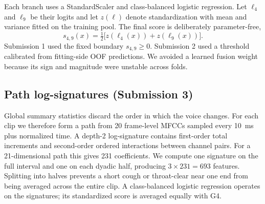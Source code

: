 Each branch uses a StandardScaler and class-balanced logistic regression.
Let $\ell_4$ and $\ell_9$ be their logits and let $z(\ell)$ denote
standardization with mean and variance fitted on the training pool. The final
score is deliberately parameter-free,
\begin{equation}
 s_{4,9}(x)=\tfrac{1}{2}\big[z(\ell_4(x))+z(\ell_9(x))\big].
 \label{eq:fusion}
\end{equation}
Submission 1 used the fixed boundary $s_{4,9}\geq0$. Submission 2 used a
threshold calibrated from fitting-side OOF predictions. We avoided a learned
fusion weight because its sign and magnitude were unstable across folds.

\subsection{Path log-signatures (Submission 3)}

Global summary statistics discard the order in which the voice changes. For
each clip we therefore form a path from 20 frame-level MFCCs sampled every
10~ms plus normalized time. A depth-2 log-signature contains first-order total
increments and second-order ordered interactions between channel pairs. For a
21-dimensional path this gives 231 coefficients. We compute one signature on
the full interval and one on each dyadic half, producing $3\times231=693$
features. Splitting into halves prevents a short cough or throat-clear near one
end from being averaged across the entire clip. A class-balanced logistic
regression operates on the signatures; its standardized score is averaged
equally with G4.

